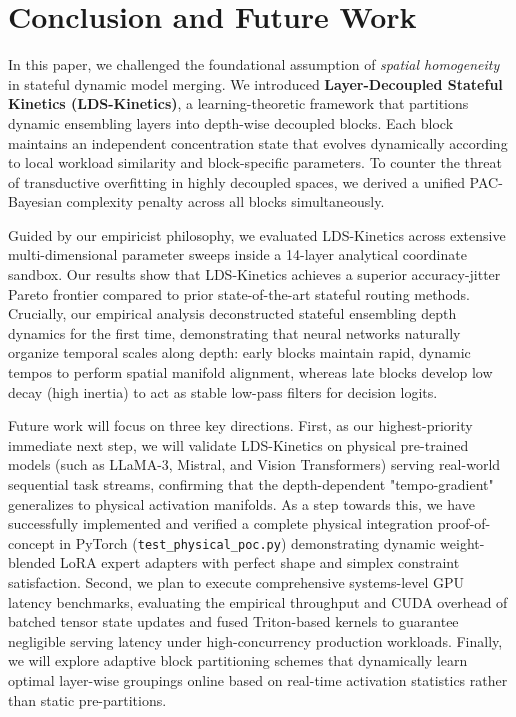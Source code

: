 \section{Conclusion and Future Work}
\label{submission:sec:conclusion}

In this paper, we challenged the foundational assumption of \emph{spatial homogeneity} in stateful dynamic model merging. We introduced \textbf{Layer-Decoupled Stateful Kinetics (LDS-Kinetics)}, a learning-theoretic framework that partitions dynamic ensembling layers into depth-wise decoupled blocks. Each block maintains an independent concentration state that evolves dynamically according to local workload similarity and block-specific parameters. To counter the threat of transductive overfitting in highly decoupled spaces, we derived a unified PAC-Bayesian complexity penalty across all blocks simultaneously.

Guided by our empiricist philosophy, we evaluated LDS-Kinetics across extensive multi-dimensional parameter sweeps inside a 14-layer analytical coordinate sandbox. Our results show that LDS-Kinetics achieves a superior accuracy-jitter Pareto frontier compared to prior state-of-the-art stateful routing methods. Crucially, our empirical analysis deconstructed stateful ensembling depth dynamics for the first time, demonstrating that neural networks naturally organize temporal scales along depth: early blocks maintain rapid, dynamic tempos to perform spatial manifold alignment, whereas late blocks develop low decay (high inertia) to act as stable low-pass filters for decision logits.

Future work will focus on three key directions. First, as our highest-priority immediate next step, we will validate LDS-Kinetics on physical pre-trained models (such as LLaMA-3, Mistral, and Vision Transformers) serving real-world sequential task streams, confirming that the depth-dependent "tempo-gradient" generalizes to physical activation manifolds. As a step towards this, we have successfully implemented and verified a complete physical integration proof-of-concept in PyTorch (\texttt{test\_physical\_poc.py}) demonstrating dynamic weight-blended LoRA expert adapters with perfect shape and simplex constraint satisfaction. Second, we plan to execute comprehensive systems-level GPU latency benchmarks, evaluating the empirical throughput and CUDA overhead of batched tensor state updates and fused Triton-based kernels to guarantee negligible serving latency under high-concurrency production workloads. Finally, we will explore adaptive block partitioning schemes that dynamically learn optimal layer-wise groupings online based on real-time activation statistics rather than static pre-partitions.
